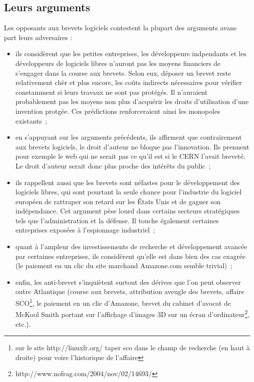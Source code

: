 \documentclass[pdftex,a4paper,11pt]{report}
\begin{document}
\subsection{Leurs arguments}
Les opposants aux brevets logiciels contestent la plupart des arguments avans part leurs adversaires :
\begin{itemize}
\item ils considèrent que les petites entreprises, les développeurs indpendants et les développeurs de logiciels libres n'auront pas les moyens financiers de s'engager dans la course aux brevets. Selon eux, déposer un brevet reste relativement chèr et plus encore, les coûts indirects nécessaires pour vérifier constamment si leurs travaux ne sont pas protégés. Il n'auraient probablement pas les moyens non plus d'acquérir les droits d'utilisation d'une invention protgée. Ces prédictions renforceraient ainsi les monopoles existants~;
\item en s'appuyant sur les arguments précédents, ils affirment que contrairement aux brevets logiciels, le droit d'auteur ne bloque pas l'innovation. Ils prennent pour exemple le web qui ne serait pas ce qu'il est si le CERN l'avait breveté. Le droit d'auteur serait donc plus  proche des intérêts du public~;
\item ils rappellent aussi que les brevets sont néfastes pour le développement des logiciels libres, qui sont pourtant la seule chance pour l'industrie du logiciel européen de rattraper son retard sur les États Unis et de gagner son indépendance. Cet argument pèse lourd dans certains secteurs stratégiques tels que l'administration et la défense. Il touche également certaines entreprises exposées à l'espionnage industriel~;
\item quant à l'ampleur des investissements de recherche et développement avancée par certaines entreprises, ils considèrent qu'elle est dans bien des cas exagrée (le paiement en un clic du site marchand Amazone.com semble trivial)~;
\item enfin, les anti-brevet s'inquiètent surtout des dérives que l'on peut observer outre Atlantique (course aux brevets, attribution aveugle des brevets, affaire SCO\footnote{sur le site http://linuxfr.org/ taper sco dans le champ de recherche (en haut à droite) pour voire l'historique de l'affaire}, le paiement en un clic d'Amazone, brevet du cabinet d'avocat de McKool Smith portant sur l'affichage d'images 3D sur un écran d'ordinateur\footnote{http://www.nofrag.com/2004/nov/02/14693/}, etc.).
\end{itemize}
\end{document}
